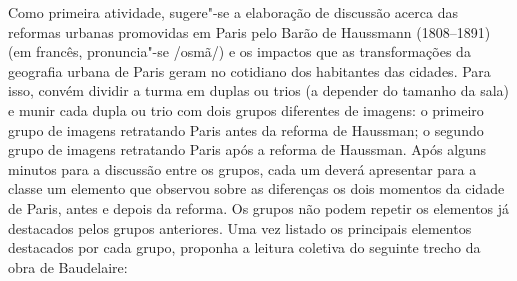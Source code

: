 \documentclass[12pt]{extarticle}
\begin{document}
Como primeira atividade, sugere"-se a elaboração de discussão acerca das reformas urbanas promovidas em Paris pelo Barão de Haussmann (1808--1891)
(em francês, pronuncia"-se /osmã/) e os impactos que as transformações da geografia urbana de Paris geram no cotidiano dos habitantes das cidades. Para isso, convém dividir a turma em duplas ou trios (a depender do tamanho da sala) e munir cada dupla ou trio com dois grupos diferentes de imagens: o primeiro grupo de imagens retratando Paris antes da reforma de Haussman; o segundo grupo de imagens retratando Paris após a reforma de Haussman. Após alguns minutos para a discussão entre os grupos, cada um deverá apresentar para a classe um elemento que observou sobre as diferenças os dois momentos da cidade de Paris, antes e depois da reforma. Os grupos não podem repetir os elementos já destacados pelos grupos anteriores. Uma vez listado os principais elementos destacados por cada grupo, proponha a leitura coletiva do seguinte trecho da obra de Baudelaire:
\end{document}
